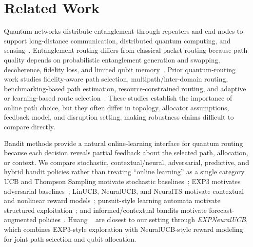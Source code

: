 \section{Related Work}
\label{sec:RelatedWork}

Quantum networks distribute entanglement through repeaters and end nodes to support long-distance communication, distributed quantum computing, and sensing~\cite{wehner2018quantum,kimble2008quantum}. Entanglement routing differs from classical packet routing because path quality depends on probabilistic entanglement generation and swapping, decoherence, fidelity loss, and limited qubit memory~\cite{briegel1998quantum,dahlberg2021netsquid,bennett1993teleporting,zukowski1993event}. Prior quantum-routing work studies fidelity-aware path selection, multipath/inter-domain routing, benchmarking-based path estimation, resource-constrained routing, and adaptive or learning-based route selection~\cite{wang2025learning,li2025multipath,liu2024qbgp,wang2024adaptive,chaudhary2023quantum,jallowkhan2025adaptive,clayton2024quarc,cicconetti2024scalable,kumar2024routing,leone2021costvector}. These studies establish the importance of online path choice, but they often differ in topology, allocator assumptions, feedback model, and disruption setting, making robustness claims difficult to compare directly.

Bandit methods provide a natural online-learning interface for quantum routing because each decision reveals partial feedback about the selected path, allocation, or context. We compare stochastic, contextual/neural, adversarial, predictive, and hybrid bandit policies rather than treating ``online learning'' as a single category. UCB and Thompson Sampling motivate stochastic baselines~\cite{auer2002finite,thompson1933likelihood}; EXP3 motivates adversarial baselines~\cite{auer2002nonstochastic}; LinUCB, NeuralUCB, and NeuralTS motivate contextual and nonlinear reward models~\cite{li2010contextual,chu2011contextual,zhou2020neuralucb,zhang2022neuralts}; pursuit-style learning automata motivate structured exploitation~\cite{thathachar2011networks}; and informed/contextual bandits motivate forecast-augmented policies~\cite{kar2024icmab,box2015time}. Huang \etal~\cite{huang2024quantum} are closest to our setting through \emph{EXPNeuralUCB}, which combines EXP3-style exploration with NeuralUCB-style reward modeling for joint path selection and qubit allocation.

